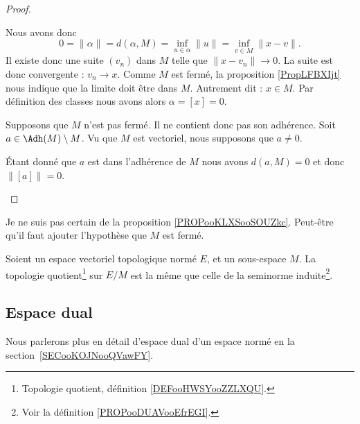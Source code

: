 \begin{proof}
\begin{subproof}
		Nous avons donc
		\begin{equation}
			0=\| \alpha \|=d(\alpha,M)=\inf_{u\in \alpha}\| u \|=\inf_{v\in M}\| x-v \|.
		\end{equation}
		Il existe donc une suite \( (v_n)\) dans \( M\) telle que \( \| x-v_n \|\to 0\). La suite est donc convergente : \( v_n\to x\). Comme \( M\) est fermé, la proposition \ref{PropLFBXIjt} nous indique que la limite doit être dans \( M\). Autrement dit : \( x\in M\). Par définition des classes nous avons alors \( \alpha=[x]=0\).

		Supposons que \( M\) n'est pas fermé. Il ne contient donc pas son adhérence. Soit \( a\in \Adh(M)\setminus M\). Vu que \( M\) est vectoriel, nous supposons que \( a\neq 0\).

		Étant donné que \( a\) est dans l'adhérence de \( M\) nous avons \( d(a,M)=0\) et donc \( \| [a] \|=0\).
	\end{subproof}
\end{proof}


\begin{probleme}    %
	Je ne suis pas certain de la proposition \ref{PROPooKLXSooSOUZkc}. Peut-être qu'il faut ajouter l'hypothèse que \( M\) est fermé.
\end{probleme}

\begin{proposition}     \label{PROPooKLXSooSOUZkc}
	Soient un espace vectoriel topologique normé \( E\), et un sous-espace \( M\). La topologie quotient\footnote{Topologie quotient, définition \ref{DEFooHWSYooZZLXQU}.} sur \( E/M\) est la même que celle de la seminorme induite\footnote{Voir la définition \ref{PROPooDUAVooEfrEGI}.}.
\end{proposition}

\subsection{Espace dual}

Nous parlerons plus en détail d'espace dual d'un espace normé en la section~\ref{SECooKOJNooQVawFY}.

